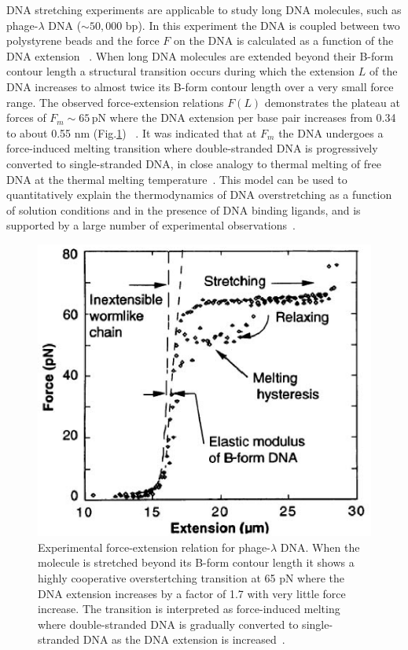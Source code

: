 \documentclass[12pt,masters,final]{UTRGVthesis}
\begin{document}
DNA stretching experiments are applicable to study long DNA molecules, such as
phage-$\lambda$ DNA ($\sim 50,000$ bp).
In this experiment the DNA is coupled between two polystyrene beads and the force $F$ on
the DNA is calculated as a function of the DNA extension
~\cite{Smith:1996, CS:2000, Strick:2003, C:2010}. 
When long DNA molecules are extended beyond their B-form contour length a structural
transition occurs during which 
the extension $L$ of the DNA increases to almost twice its B-form contour length over a very 
small force range. The observed force-extension relations $F(L)$ demonstrates 
the plateau at forces of $F_m \sim 65$\,pN where the DNA extension per base pair increases 
from 0.34 to about 0.55 nm (Fig.\ref{fig:DNA overstretching})
~\cite{Smith:1996, CS:2000, Strick:2003, C:2010}.
It was indicated that at $F_m$ the 
DNA undergoes a force-induced melting transition where double-stranded DNA is progressively
converted to single-stranded DNA, in close analogy to thermal melting of free DNA at the
thermal melting temperature~\cite{C:2010}. This model 
can be used to quantitatively explain the thermodynamics of DNA overstretching as a function 
of solution conditions and in the presence of DNA binding ligands, and is supported by a 
large number of experimental observations~\cite{C:2010}. 
%
\begin{figure}[!h]
  \includegraphics[width=0.5 \textwidth]{dna_overstretching.eps}
  \caption{\small Experimental force-extension relation for phage-$\lambda$ DNA. When the
  molecule is stretched beyond its B-form contour length it shows a highly cooperative
  overstertching transition at 65 pN where the DNA extension increases by a
  factor of 1.7 with very little force increase. The transition is interpreted as
  force-induced melting where double-stranded DNA is gradually converted to
  single-stranded DNA as the DNA extension is increased~\protect\cite{Smith:1996}.}
  \label{fig:DNA overstretching}
\end{figure}
%
\newpage
\end{document}
